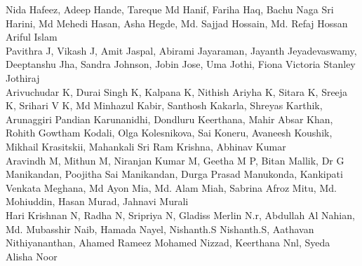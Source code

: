 \documentclass[11pt,oneside]{book}
\begin{document}
\begin{description}
      \newline
          Nida Hafeez, Adeep Hande, Tareque Md Hanif, Fariha Haq, Bachu Naga Sri Harini, Md Mehedi Hasan, Asha Hegde, Md. Sajjad Hossain, Md. Refaj Hossan\\
      \newline
          Ariful Islam\\
      \newline
          Pavithra J, Vikash J, Amit Jaspal, Abirami Jayaraman, Jayanth Jeyadevaswamy, Deeptanshu Jha, Sandra Johnson, Jobin Jose, Uma Jothi, Fiona Victoria Stanley Jothiraj\\
      \newline
          Arivuchudar K, Durai Singh K, Kalpana K, Nithish Ariyha K, Sitara K, Sreeja K, Srihari V K, Md Minhazul Kabir, Santhosh Kakarla, Shreyas Karthik, Arunaggiri Pandian Karunanidhi, Dondluru Keerthana, Mahir Absar Khan, Rohith Gowtham Kodali, Olga Kolesnikova, Sai Koneru, Avaneesh Koushik, Mikhail Krasitskii, Mahankali Sri Ram Krishna, Abhinav Kumar\\
      \newline
          Aravindh M, Mithun M, Niranjan Kumar M, Geetha M P, Bitan Mallik, Dr G Manikandan, Poojitha Sai Manikandan, Durga Prasad Manukonda, Kankipati Venkata Meghana, Md Ayon Mia, Md. Alam Miah, Sabrina Afroz Mitu, Md. Mohiuddin, Hasan Murad, Jahnavi Murali\\
      \newline
          Hari Krishnan N, Radha N, Sripriya N, Gladiss Merlin N.r, Abdullah Al Nahian, Md. Mubasshir Naib, Hamada Nayel, Nishanth.S Nishanth.S, Aathavan Nithiyananthan, Ahamed Rameez Mohamed Nizzad, Keerthana Nnl, Syeda Alisha Noor\\

\end{description}
\end{document}
